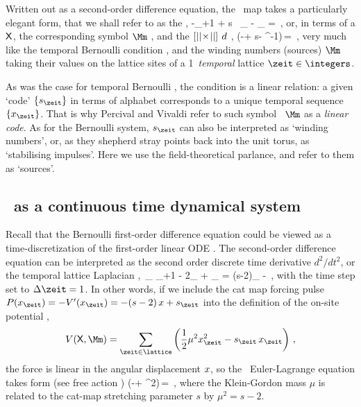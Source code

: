 Written out as a second-order difference equation, the \PV\ map
 takes a particularly elegant form, that we shall
refer to as the {\em \templatt} ,
\beq
-\ssp_{\zeit+1}  +  s \, \ssp_{\zeit} - \ssp_{}
    =
\Ssym{\zeit}
\,,
or,
in terms of a {{\lattstate}} $\mathsf{X}$, the corresponding {symbol \brick}
$\Mm$ , and the $[{||}\!\times\!{||}]$ {\shiftOp}
$d$ ,
\beq
(-\shift + s\id - \shift^{-1})\,\Xx =  \Mm
\,,
very much like the {temporal Bernoulli} condition , and
the winding numbers (sources) $\Mm$ taking their values on the lattice
sites of a 1\dmn\ \emph{temporal} lattice $\zeit\in\integers$.

As was the case for {temporal Bernoulli} , the condition
 is a linear relation: a given `code'
$\{\Ssym{\zeit}\}$ in terms of alphabet  corresponds
to a unique temporal sequence $\{\ssp_\zeit\}$. That is why Percival and
Vivaldi refer to such symbol \brick\ $\Mm$ as a {\em linear
code}. As for the Bernoulli system, $\Ssym{\zeit}$ can also be
interpreted as `winding numbers', or, as they shepherd
stray points back into the unit torus, as `stabilising
impulses'. Here we use the field-theoretical parlance,
and refer to them  as `sources'.

                               \toCB

\subsection{\tempLatt\ as a continuous time dynamical system}
\label{s:tempCatODE}

Recall that the Bernoulli first-order difference equation could be viewed as
a time-discretization of the first-order linear ODE . The
second-order difference equation  can be interpreted as the
second order discrete time derivative ${d^2}/{dt^2}$, or the temporal
lattice Laplacian ,
\beq
\Box\,\ssp_\zeit \equiv
\ssp_{\zeit+1} - 2\ssp_{\zeit} + \ssp_{}
= (s-2)\ssp_{\zeit} -\Ssym{\zeit}
\,,
 with the time step set to $\Delta\zeit=1$.
In other words, if we include the cat map forcing pulse
\(
P(\ssp_\zeit)= - V'(\ssp_\zeit) = - (s-2)\,\ssp + \Ssym{\zeit}
\)
into the definition of
the on-site potential ,
\[
V(\Xx,\Mm) = \sum_{\zeit\in\lattice}\left(
\frac{1}{2}\mu^2\ssp_\zeit^2 -\Ssym{\zeit}\,\ssp_\zeit\right)
\,,
\]
the force
is linear in the angular displacement $x$, so
the \templatt\ Euler-Lagrange equation takes form (see free action
)
\beq
(-\Box + {\mu}^2\id)\,\Xx = \Mm
\,,
where the Klein-Gordon mass ${\mu}$ is related to the cat-map
stretching parameter ${s}$ by ${\mu}^2={s}-2$.


